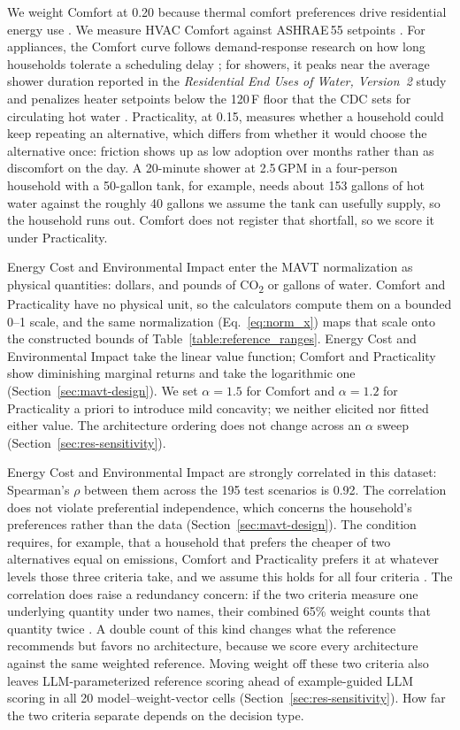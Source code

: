 \documentclass[final,3p,times]{elsarticle}
\begin{document}
We weight Comfort at 0.20 because thermal comfort preferences drive residential energy use \cite{sintov2019}. We measure HVAC Comfort against ASHRAE\,55 setpoints \cite{ashrae55_2020}. For appliances, the Comfort curve follows demand-response research on how long households tolerate a scheduling delay \cite{paetz2012,waseem2020}; for showers, it peaks near the average shower duration reported in the \textit{Residential End Uses of Water, Version~2} study \cite{reu2016} and penalizes heater setpoints below the 120\,\textdegree{}F floor that the CDC sets for circulating hot water \cite{cdc2026}. Practicality, at 0.15, measures whether a household could keep repeating an alternative, which differs from whether it would choose the alternative once: friction shows up as low adoption over months rather than as discomfort on the day. A 20-minute shower at 2.5\,GPM in a four-person household with a 50-gallon tank, for example, needs about 153 gallons of hot water against the roughly 40 gallons we assume the tank can usefully supply, so the household runs out. Comfort does not register that shortfall, so we score it under Practicality.

Energy Cost and Environmental Impact enter the MAVT normalization as physical quantities: dollars, and pounds of CO\textsubscript{2} or gallons of water. Comfort and Practicality have no physical unit, so the calculators compute them on a bounded 0--1 scale, and the same normalization (Eq.~\ref{eq:norm_x}) maps that scale onto the constructed bounds of Table~\ref{table:reference_ranges}. Energy Cost and Environmental Impact take the linear value function; Comfort and Practicality show diminishing marginal returns and take the logarithmic one (Section~\ref{sec:mavt-design}). We set $\alpha = 1.5$ for Comfort and $\alpha = 1.2$ for Practicality a priori to introduce mild concavity; we neither elicited nor fitted either value. The architecture ordering does not change across an $\alpha$ sweep (Section~\ref{sec:res-sensitivity}).

Energy Cost and Environmental Impact are strongly correlated in this dataset: Spearman's $\rho$ between them across the 195 test scenarios is 0.92. The correlation does not violate preferential independence, which concerns the household's preferences rather than the data (Section~\ref{sec:mavt-design}). The condition requires, for example, that a household that prefers the cheaper of two alternatives equal on emissions, Comfort and Practicality prefers it at whatever levels those three criteria take, and we assume this holds for all four criteria \cite{keeneyraiffa1976,dyer1979}. The correlation does raise a redundancy concern: if the two criteria measure one underlying quantity under two names, their combined 65\% weight counts that quantity twice \cite{keeneyraiffa1976}. A double count of this kind changes what the reference recommends but favors no architecture, because we score every architecture against the same weighted reference. Moving weight off these two criteria also leaves LLM-parameterized reference scoring ahead of example-guided LLM scoring in all 20 model--weight-vector cells (Section~\ref{sec:res-sensitivity}). How far the two criteria separate depends on the decision type.
\end{document}
